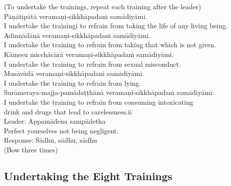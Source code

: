 (To undertake the trainings, repeat each training after the leader)\\
Pāṇātipātā veramaṇi-sikkhāpadaṁ samādiyāmi.\\
I undertake the trainingi to refrain from taking the life of any living being.\\
Adinnādānā veramaṇi-sikkhāpadaṁ samādiyāmi.\\
I undertake the training to refrain from taking that which is not given.\\
Kāmesu micchācārā veramaṇi-sikkhāpadaṁ samādiyāmi.\\
I undertake the training to refrain from sexual misconduct.\\
Musāvādā veramaṇi-sikkhāpadaṁ samādiyāmi.\\
I undertake the training to refrain from lying.\\
Surāmeraya-majja-pamādaṭṭhānā veramaṇi-sikkhāpadaṁ samādiyāmi.\\
I undertake the training to refrain from consuming intoxicating\\
drink and drugs that lead to carelessness.ii\\
Leader: Appamādena sampādetha\\
         Perfect yourselves not being negligent.\\
Response: Sādhu, sādhu, sādhu\\

(Bow three times)\\

\subsection{Undertaking the Eight Trainings}

